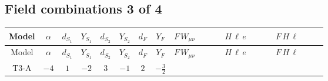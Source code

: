 \documentclass[8pt]{article}
\begin{document}
\begin{landscape}
\subsection*{Field combinations 3 of 4}
\begin{longtable}{@{}cccccccc >{\raggedright\arraybackslash}p{0.21\linewidth} >{\raggedright\arraybackslash}p{0.21\linewidth} >{\raggedright\arraybackslash}p{0.21\linewidth}@{}}
\toprule
Model & $\alpha$ & $d_{S_1}$ & $Y_{S_1}$ & $d_{S_2}$ & $Y_{S_2}$ & $d_F$ & $Y_F$ & $F\,W_{\mu\nu}$ & $H\,\ell\,e$ & $F\,H\,\ell$ \\
\midrule
\endfirsthead
\toprule
Model & $\alpha$ & $d_{S_1}$ & $Y_{S_1}$ & $d_{S_2}$ & $Y_{S_2}$ & $d_F$ & $Y_F$ & $F\,W_{\mu\nu}$ & $H\,\ell\,e$ & $F\,H\,\ell$ \\
\midrule
\endhead
T3-A & $-4$ & $1$ & $-2$ & $3$ & $-1$ & $2$ & $-\frac{3}{2}$ & \scriptsize\adjustbox{max width=\linewidth}{$\begin{gathered} -\frac{1}{2} \hbar  \log \left(\frac{\bar{\mu}^{2}}{M_F^2}\right) \left(W_{\mu _1\mu _2}^{A_1}\right){}^2\end{gathered}$} & \scriptsize\adjustbox{max width=\linewidth}{$\begin{gathered} +\frac{\hbar  \overline{y_{1,i_3,r_1}} \overline{L_{a_1,i_2}}\, P_R\, e_{i_1} H_{a_1} y_{1,i_2,r_1} Y_{e,i_3,i_1}}{4 \epsilon } \\ -\frac{1}{8} \hbar  \overline{y_{1,i_3,r_1}} \overline{L_{a_1,i_2}}\, P_R\, e_{i_1} H_{a_1} y_{1,i_2,r_1} Y_{e,i_3,i_1} \\ +\frac{\sqrt{3} \hbar  \overline{y_{2,i_3,r_1}} \overline{L_{a_1,i_2}}\, P_R\, e_{i_1} H_{a_1} y_{2,i_2,r_1} Y_{e,i_3,i_1}}{4 \epsilon }\end{gathered}$} & \scriptsize\adjustbox{max width=\linewidth}{$\begin{gathered} +\frac{2 \hbar  \log \left(\frac{M_F^2}{m_2^2}\right) \overline{y_{1,i_1,r_1}} \overline{y_{2,i_2,r_1}} L_{a_4,i_2}{}^T\, C\, P_L\, L_{a_2,i_1} H_{a_1} H_{a_3} m_2^2 \lambda_5 \epsilon_{a_1,a_2} \epsilon_{a_3,a_4} M_F^3}{\sqrt{3} \left(M_F^2-m_1^2\right) \left(M_F^2-m_2^2\right) \left(m_1^2-m_2^2\right)} \\ -\frac{2 \hbar  \log \left(\frac{M_F^2}{m_1^2}\right) \overline{y_{1,i_1,r_1}} \overline{y_{2,i_2,r_1}} L_{a_4,i_2}{}^T\, C\, P_L\, L_{a_2,i_1} H_{a_1} H_{a_3} m_1^2 \lambda_5 \epsilon_{a_1,a_2} \epsilon_{a_3,a_4} M_F^3}{\sqrt{3} \left(M_F^2-m_1^2\right) \left(M_F^2-m_2^2\right) \left(m_1^2-m_2^2\right)} \\ +\frac{2 \hbar  \log \left(\frac{M_F^2}{m_2^2}\right) \overline{\lambda_5} \overline{L_{a_3,i_1}}\, C\, P_R\, \overline{L_{a_4,i_2}}{}^T m_2^2 y_{1,i_1,r_1} y_{2,i_2,r_1} \epsilon_{a_1,a_3} \epsilon_{a_2,a_4} H_{a_1}{}^{\dagger } H_{a_2}{}^{\dagger } M_F^3}{\sqrt{3} \left(M_F^2-m_1^2\right) \left(M_F^2-m_2^2\right) \left(m_1^2-m_2^2\right)}\end{gathered}$} \\

\end{longtable}
\end{landscape}
\end{document}
